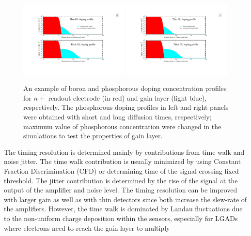 \documentclass[aps,pt14,superscriptaddress,floatfix,nofootinbib]{revtex4}
\begin{document}
\begin{figure}[hbtp]
\begin{center}
\includegraphics[width=0.49\textwidth,keepaspectratio]{figures1/ThinDopingProfile.pdf}
\includegraphics[width=0.49\textwidth,keepaspectratio]{figures1/ThickDopingProfile.pdf}
\caption{An example of boron and phosphorous doping concentration profiles for $n+$ readout electrode (in red) and gain layer (light blue), respectively. The phosphorous doping profiles in left and right panels were obtained with short and long diffusion times, respectively; maximum value of phosphorous concentration were changed in the simulations to test the properties of gain layer.\label{fig:DopingProfiles}} 
\end{center}
\end{figure}

The timing resolution is determined mainly by contributions from time walk and noise
jitter. The time walk contribution is usually minimized by using Constant Fraction
Discrimination (CFD) or determining time of the signal crossing fixed threshold.
The jitter contribution is determined by the rise of the signal at the output of
the amplifier and noise level. The timing resolution can be improved with larger
gain as well as with thin detectors since both increase the slew-rate of the amplifiers.
However, the time walk is dominated by Landau fluctuations due to
the non-uniform charge deposition within the sensors, especially for LGADs where
electrons need to reach the gain layer to multiply
\end{document}

